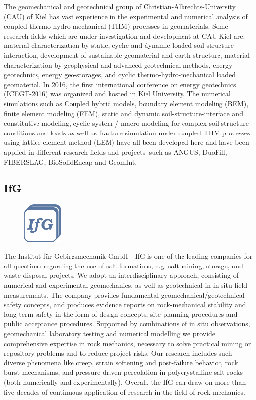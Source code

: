 The geomechanical and geotechnical group of Christian-Albrechts-University (CAU) of Kiel has vast experience in the experimental and numerical analysis of coupled thermo-hydro-mechanical (THM) processes in geomaterials. Some research fields which are under investigation and development at CAU Kiel are: material characterization by static, cyclic and dynamic loaded soil-structure-interaction, development of sustainable geomaterial and earth structure, material characterization by geophysical and advanced geotechnical methods, energy geotechnics, energy geo-storages, and cyclic thermo-hydro-mechanical loaded geomaterial. In 2016, the first international conference on energy geotechnics (ICEGT-2016) was organized and hosted in Kiel University. The numerical simulations such as Coupled hybrid models, boundary element modeling (BEM), finite element modeling (FEM), static and dynamic soil-structure-interface and constitutive modeling, cyclic system / macro modeling for complex soil-structure-conditions and loads as well as fracture simulation under coupled THM processes using lattice element method (LEM) have all been developed here and have been applied in different research fields and projects, such as ANGUS, DuoFill, FIBERSLAG, BioSolidEncap and GeomInt.

\subsection{IfG}
\begin{figure}
\centering
\includegraphics[width=2cm]{figures/logo-ifg-klein.png}
\end{figure}
The Institut f\"ur Gebirgsmechanik GmbH - IfG is one of the leading companies for all questions regarding the use of salt formations, e.g. salt mining, storage, and waste disposal projects. We adopt an interdisciplinary approach, consisting of numerical and experimental geomechanics, as well as geotechnical in in-situ field measurements. The company provides fundamental geomechanical/geotechnical safety concepts, and produces evidence reports on rock-mechanical stability and long-term safety in the form of design concepts, site planning procedures and public acceptance procedures. Supported by combinations of in situ observations, 
geomechanical laboratory testing and numerical modelling we provide comprehensive expertise in rock mechanics, necessary to solve practical mining or repository problems and to reduce project risks. Our research includes such diverse phenomena like creep, strain softening and post-failure behavior, rock burst mechanisms, and pressure-driven percolation in polycrystalline salt rocks (both numerically and experimentally). Overall, the IfG can draw on more than five decades of continuous application of research in the field of rock mechanics.

